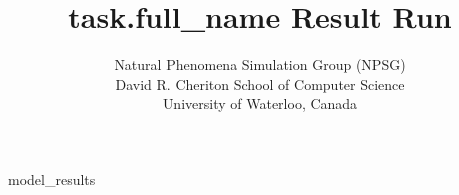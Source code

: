 \documentclass{article}
\begin{document}
\title{{{task.full_name}} Result Run}
\author{Natural Phenomena Simulation Group (NPSG)\\David R. Cheriton School of Computer Science\\University of Waterloo, Canada}

\maketitle

{{model_results}}
\end{document}
